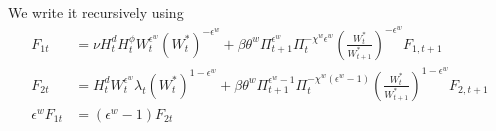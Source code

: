\documentclass[11pt]{article}
\begin{document}
We write it recursively using
\begin{align*}
	F_{1t} & = \nu H_{t}^d H_{t}^{\phi} W_{t}^{\epsilon^w} (W_t^*)^{-\epsilon^w} + \beta\theta^w \Pi_{t+1}^{\epsilon^w} \Pi_{t}^{-\chi^w\epsilon^w}  \left(\frac{W_t^*}{W_{t+1}^*}\right)^{-\epsilon^w} F_{1,t+1} \\ 
%
	F_{2t} & = H_{t}^d W_{t}^{\epsilon^w} \lambda_{t}(W_t^*)^{1-\epsilon^w} + \beta\theta^w  \Pi_{t+1}^{\epsilon^w-1} \Pi_{t}^{-\chi^w(\epsilon^w-1)}  \left(\frac{W_t^*}{W_{t+1}^*}\right)^{1-\epsilon^w}  F_{2,t+1} \\ 
	\epsilon^w  F_{1t}&=(\epsilon^w-1)F_{2t}
\end{align*}
\end{document}
